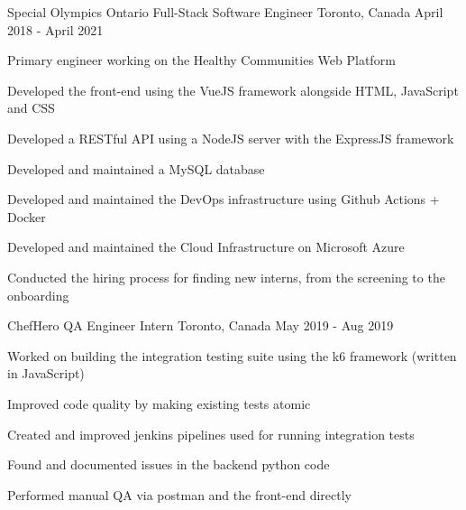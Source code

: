 


\begin{cventries}


\cventry
{Special Olympics Ontario} %
{Full-Stack Software Engineer} %
{Toronto, Canada} %
{April 2018 - April 2021} %
{ %
\begin{cvitems}
\item {Primary engineer working on the Healthy Communities Web Platform}
\item {Developed the front-end using the VueJS framework alongside HTML, JavaScript and CSS}
\item {Developed a RESTful API using a NodeJS server with the ExpressJS framework}
\item {Developed and maintained a MySQL database}
\item {Developed and maintained the DevOps infrastructure using Github Actions + Docker}
\item {Developed and maintained the Cloud Infrastructure on Microsoft Azure}
\item {Conducted the hiring process for finding new interns, from the screening to the onboarding}
\end{cvitems}
}


\cventry
{ChefHero} %
{QA Engineer Intern} %
{Toronto, Canada} %
{May 2019 - Aug 2019} %
{ %
\begin{cvitems}
\item {Worked on building the integration testing suite using the k6 framework (written in JavaScript)}
\item {Improved code quality by making existing tests atomic}
\item {Created and improved jenkins pipelines used for running integration tests}
\item {Found and documented issues in the backend python code}
\item {Performed manual QA via postman and the front-end directly}
\end{cvitems}
}


\end{cventries}